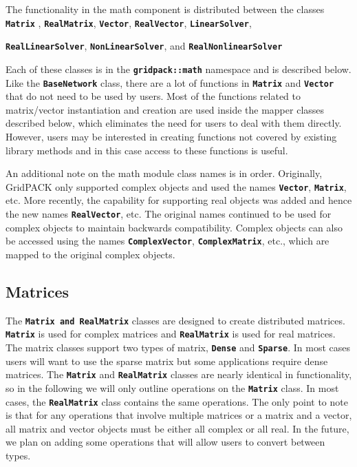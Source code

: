 \documentclass[12pt]{report} %
\begin{document}
The functionality in the math component is distributed between the classes \texttt{\textbf{Matrix}} , \texttt{\textbf{RealMatrix}}, \texttt{\textbf{Vector}}, \texttt{\textbf{RealVector}}, \texttt{\textbf{LinearSolver}}, 

\texttt{\textbf{RealLinearSolver}}, \texttt{\textbf{NonLinearSolver}}, and \texttt{\textbf{RealNonlinearSolver}}


Each of these classes is in the \texttt{\textbf{gridpack::math}} namespace and is described below. Like the \texttt{\textbf{BaseNetwork}} class, there are a lot of functions in \texttt{\textbf{Matrix}} and \texttt{\textbf{Vector}} that do not need to be used by users. Most of the functions related to matrix/vector instantiation and creation are used inside the mapper classes described below, which eliminates the need for users to deal with them directly. However, users may be interested in creating functions not covered by existing library methods and in this case access to these functions is useful.

An additional note on the math module class names is in order. Originally, GridPACK only supported complex objects and used the names \texttt{\textbf{Vector}}, \texttt{\textbf{Matrix}}, etc. More recently, the capability for supporting real objects was added and hence the new names \texttt{\textbf{RealVector}}, etc. The original names continued to be used for complex objects to maintain backwards compatibility. Complex objects can also be accessed using the names \texttt{\textbf{ComplexVector}}, \texttt{\textbf{ComplexMatrix}}, etc., which are mapped to the original complex objects.

\subsection{Matrices}

The \texttt{\textbf{Matrix and RealMatrix}} classes are designed to create distributed matrices. \texttt{\textbf{Matrix}} is used for complex matrices and \texttt{\textbf{RealMatrix}} is used for real matrices. The matrix classes support two types of matrix, \texttt{\textbf{Dense}} and \texttt{\textbf{Sparse}}. In most cases users will want to use the sparse matrix but some applications require dense matrices. The \texttt{\textbf{Matrix}} and \texttt{\textbf{RealMatrix}} classes are nearly identical in functionality, so in the following we will only outline operations on the \texttt{\textbf{Matrix}} class. In most cases, the \texttt{\textbf{RealMatrix}} class contains the same operations. The only point to note is that for any operations that involve multiple matrices or a matrix and a vector, all matrix and vector objects must be either all complex or all real. In the future, we plan on adding some operations that will allow users to convert between types.
\end{document}
